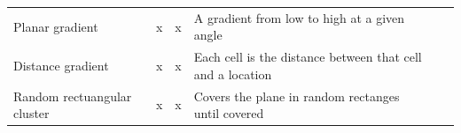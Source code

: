 \documentclass[11pt]{article}
\begin{document}
\begin{longtable}[]{@{}llllll@{}}
\begin{minipage}[t]{0.35\columnwidth}
Planar gradient\strut
\end{minipage} & \begin{minipage}[t]{0.07\columnwidth}\raggedright
x\strut
\end{minipage} & \begin{minipage}[t]{0.05\columnwidth}\raggedright
x\strut
\end{minipage} & \begin{minipage}[t]{0.33\columnwidth}\raggedright
A gradient from low to high at a given angle\strut
\end{minipage} & \begin{minipage}[t]{0.02\columnwidth}\raggedright
\strut
\end{minipage} & \begin{minipage}[t]{0.02\columnwidth}\raggedright
\strut
\end{minipage}\tabularnewline
\begin{minipage}[t]{0.35\columnwidth}\raggedright
Distance gradient\strut
\end{minipage} & \begin{minipage}[t]{0.07\columnwidth}\raggedright
x\strut
\end{minipage} & \begin{minipage}[t]{0.05\columnwidth}\raggedright
x\strut
\end{minipage} & \begin{minipage}[t]{0.33\columnwidth}\raggedright
Each cell is the distance between that cell and a location\strut
\end{minipage} & \begin{minipage}[t]{0.02\columnwidth}\raggedright
\strut
\end{minipage} & \begin{minipage}[t]{0.02\columnwidth}\raggedright
\strut
\end{minipage}\tabularnewline
\begin{minipage}[t]{0.35\columnwidth}\raggedright
Random rectuangular cluster\strut
\end{minipage} & \begin{minipage}[t]{0.07\columnwidth}\raggedright
x\strut
\end{minipage} & \begin{minipage}[t]{0.05\columnwidth}\raggedright
x\strut
\end{minipage} & \begin{minipage}[t]{0.33\columnwidth}\raggedright
Covers the plane in random rectanges until covered\strut
\end{minipage} & \begin{minipage}[t]{0.02\columnwidth}\raggedright

\end{minipage}
\end{longtable}
\end{document}
